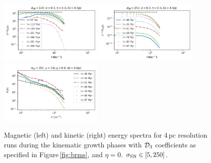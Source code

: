 \documentclass[iop,apj,numberedappendix,twocolappendix]{emulateapj}
\begin{document}
\begin{figure}
\includegraphics[trim=0.0cm 0.00cm 0.0cm 0.0cm,clip=true,width=0.45\textwidth]{csc_figs/4pc_2SNseedkpower.png}
\includegraphics[trim=0.0cm 0.00cm 0.0cm 0.0cm,clip=true,width=0.45\textwidth]{csc_figs/4pc_5SNseedBpower.png}
\includegraphics[trim=0.0cm 0.00cm 0.0cm 0.0cm,clip=true,width=0.45\textwidth]{csc_figs/4pc_5SNseedkpower.png}
\caption{
Magnetic (left) and kinetic (right) energy spectra for 4\,pc resolution runs 
during the kinematic growth phases with ${\cal D}_3$ 
coefficients as specified in Figure\,\ref{fig:brms}, and $\eta=0$.
 $\sigma_{\rm SN}\in[5,250]$.
\label{fig:4spectraSN}
}
\end{figure}

\end{document}

